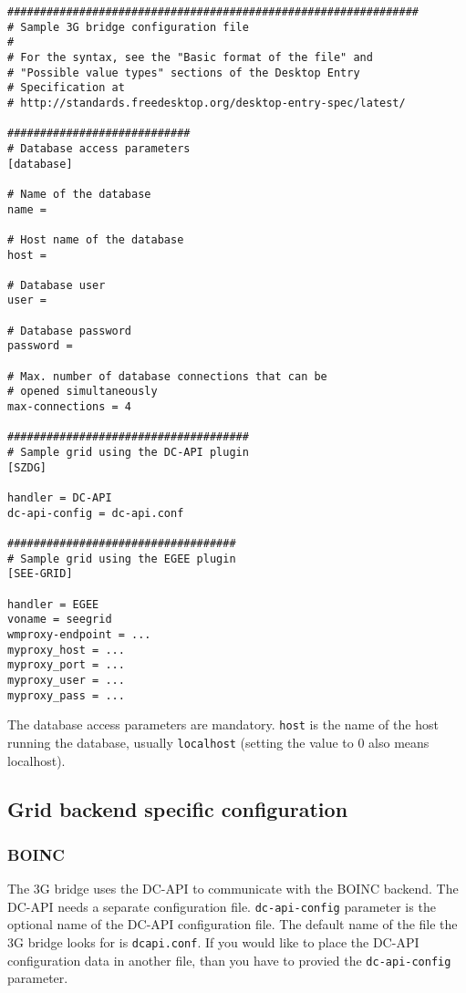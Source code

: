 \documentclass[a4paper, 12pt]{article}
\begin{document}
\begin{verbatim}
###############################################################
# Sample 3G bridge configuration file
#
# For the syntax, see the "Basic format of the file" and 
# "Possible value types" sections of the Desktop Entry 
# Specification at
# http://standards.freedesktop.org/desktop-entry-spec/latest/

############################
# Database access parameters
[database]

# Name of the database
name =

# Host name of the database
host =

# Database user
user =

# Database password
password =

# Max. number of database connections that can be 
# opened simultaneously
max-connections = 4

#####################################
# Sample grid using the DC-API plugin
[SZDG]

handler = DC-API
dc-api-config = dc-api.conf

###################################
# Sample grid using the EGEE plugin
[SEE-GRID]

handler = EGEE
voname = seegrid
wmproxy-endpoint = ...
myproxy_host = ...
myproxy_port = ...
myproxy_user = ...
myproxy_pass = ...

\end{verbatim}

The database access parameters are mandatory. {\tt host} is the name of the host running the database, usually {\tt localhost} (setting the value to 0 also means localhost). 

\subsection{Grid backend specific configuration}
\subsubsection{BOINC}
\label{subsec:boinc}
The 3G bridge uses the DC-API to communicate with the BOINC backend. The DC-API needs a separate configuration file. {\tt dc-api-config} parameter is the optional name of the DC-API configuration file. The default name of the file the 3G bridge looks for is {\tt dcapi.conf}. If you would like to place the DC-API configuration data in  another file, than you have to provied the {\tt dc-api-config} parameter. 
\end{document}
